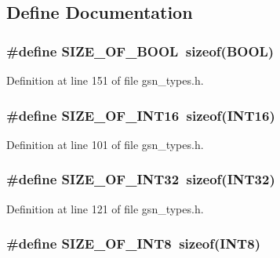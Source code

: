 \subsection{Define Documentation}
\hypertarget{a00599_a9e5aa76cc9e0a06fb7f56ecd4de43635}{
\subsubsection[{SIZE\_\-OF\_\-BOOL}]{\setlength{\rightskip}{0pt plus 5cm}\#define SIZE\_\-OF\_\-BOOL~sizeof({\bf BOOL})}}
\label{a00599_a9e5aa76cc9e0a06fb7f56ecd4de43635}


Definition at line 151 of file gsn\_\-types.h.

\hypertarget{a00599_a455564fd0dd201a9424e5114dad2d635}{
\subsubsection[{SIZE\_\-OF\_\-INT16}]{\setlength{\rightskip}{0pt plus 5cm}\#define SIZE\_\-OF\_\-INT16~sizeof({\bf INT16})}}
\label{a00599_a455564fd0dd201a9424e5114dad2d635}


Definition at line 101 of file gsn\_\-types.h.

\hypertarget{a00599_ae3ed18c0021e8539119a2b31fa5b1112}{
\subsubsection[{SIZE\_\-OF\_\-INT32}]{\setlength{\rightskip}{0pt plus 5cm}\#define SIZE\_\-OF\_\-INT32~sizeof({\bf INT32})}}
\label{a00599_ae3ed18c0021e8539119a2b31fa5b1112}


Definition at line 121 of file gsn\_\-types.h.

\hypertarget{a00599_a4aafb4570f293835708cc4b104df89cb}{
\subsubsection[{SIZE\_\-OF\_\-INT8}]{\setlength{\rightskip}{0pt plus 5cm}\#define SIZE\_\-OF\_\-INT8~sizeof({\bf INT8})}}
\label{a00599_a4aafb4570f293835708cc4b104df89cb}


